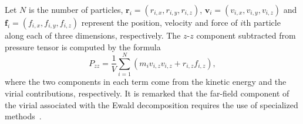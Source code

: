 Let $N$ is the number of particles, $\bm{r}_i=(r_{i,x},r_{i,y},r_{i,z})$, $\bm{v}_i=(v_{i,x},v_{i,y},v_{i,z})$ and $\bm{f}_i=(f_{i,x},f_{i,y},f_{i,z})$ represent the position, velocity and force of $i$th particle along each of three dimensions, respectively. The $z$-$z$ component subtracted from pressure tensor is computed by the formula
\begin{equation}
P_{zz}=\frac{1}{V} \sum_{i=1}^N\left(m_i v_{i,z} v_{i, z}+r_{i,z} f_{i,z}\right),
\end{equation}
where the two components in each term come from the kinetic energy and the virial contributions, respectively. It is remarked that the far-field component of  {the} virial associated with the Ewald decomposition requires the use of specialized methods~\cite{liang2022random}. 